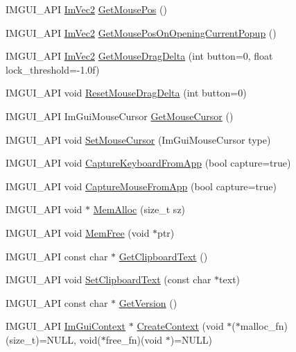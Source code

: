 \begin{DoxyCompactItemize}
\item 
I\+M\+G\+U\+I\+\_\+\+A\+PI \hyperlink{struct_im_vec2}{Im\+Vec2} \hyperlink{namespace_im_gui_abf11873349874c5d302861583c00d451}{Get\+Mouse\+Pos} ()
\item 
I\+M\+G\+U\+I\+\_\+\+A\+PI \hyperlink{struct_im_vec2}{Im\+Vec2} \hyperlink{namespace_im_gui_ac1ba5d7b76e11d47660b32dc851afd2f}{Get\+Mouse\+Pos\+On\+Opening\+Current\+Popup} ()
\item 
I\+M\+G\+U\+I\+\_\+\+A\+PI \hyperlink{struct_im_vec2}{Im\+Vec2} \hyperlink{namespace_im_gui_a94b8aecab8a4128145fea1ad7d381197}{Get\+Mouse\+Drag\+Delta} (int button=0, float lock\+\_\+threshold=-\/1.\+0f)
\item 
I\+M\+G\+U\+I\+\_\+\+A\+PI void \hyperlink{namespace_im_gui_aa03f31a184cafdf506feb2e8ba07f91e}{Reset\+Mouse\+Drag\+Delta} (int button=0)
\item 
I\+M\+G\+U\+I\+\_\+\+A\+PI Im\+Gui\+Mouse\+Cursor \hyperlink{namespace_im_gui_a3b955bb840a2411f7c19ac6687d57392}{Get\+Mouse\+Cursor} ()
\item 
I\+M\+G\+U\+I\+\_\+\+A\+PI void \hyperlink{namespace_im_gui_ae212a3516efcba50a684df202c8e63ad}{Set\+Mouse\+Cursor} (Im\+Gui\+Mouse\+Cursor type)
\item 
I\+M\+G\+U\+I\+\_\+\+A\+PI void \hyperlink{namespace_im_gui_af382f9360d73917a9e9c0d26b5797552}{Capture\+Keyboard\+From\+App} (bool capture=true)
\item 
I\+M\+G\+U\+I\+\_\+\+A\+PI void \hyperlink{namespace_im_gui_a3a86fbf0d334b30dc16fb44955f1ce54}{Capture\+Mouse\+From\+App} (bool capture=true)
\item 
I\+M\+G\+U\+I\+\_\+\+A\+PI void $\ast$ \hyperlink{namespace_im_gui_a15efb2cac4a54b35489c5984ba1b661a}{Mem\+Alloc} (size\+\_\+t sz)
\item 
I\+M\+G\+U\+I\+\_\+\+A\+PI void \hyperlink{namespace_im_gui_a269ec695c6e722ec3da85dae37f0675d}{Mem\+Free} (void $\ast$ptr)
\item 
I\+M\+G\+U\+I\+\_\+\+A\+PI const char $\ast$ \hyperlink{namespace_im_gui_a11837daee819fd90e17d80ab1eef1f99}{Get\+Clipboard\+Text} ()
\item 
I\+M\+G\+U\+I\+\_\+\+A\+PI void \hyperlink{namespace_im_gui_aa4824a1b351c063b4aff9b9f4fb5fd4d}{Set\+Clipboard\+Text} (const char $\ast$text)
\item 
I\+M\+G\+U\+I\+\_\+\+A\+PI const char $\ast$ \hyperlink{namespace_im_gui_a6488c3cfa6331c8a1e93769e580ce020}{Get\+Version} ()
\item 
I\+M\+G\+U\+I\+\_\+\+A\+PI \hyperlink{struct_im_gui_context}{Im\+Gui\+Context} $\ast$ \hyperlink{namespace_im_gui_a98a4fecf50da4fb3489cee71a72cc577}{Create\+Context} (void $\ast$($\ast$malloc\+\_\+fn)(size\+\_\+t)=N\+U\+LL, void($\ast$free\+\_\+fn)(void $\ast$)=N\+U\+LL)

\end{DoxyCompactItemize}
